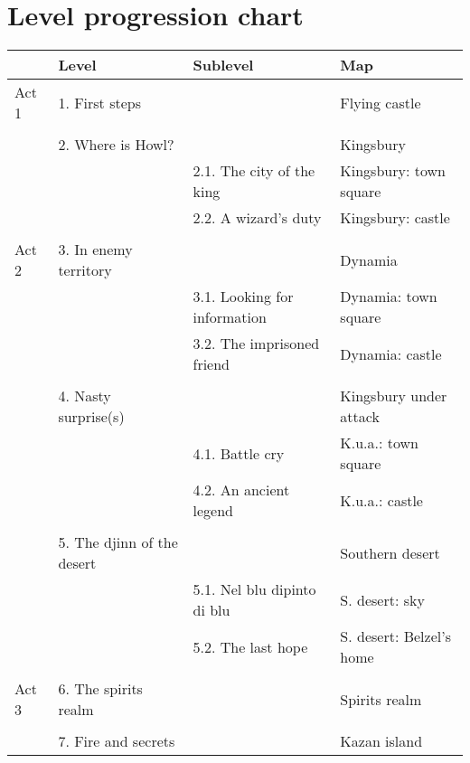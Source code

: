 \section{Level progression chart}

\begin{longtable}[H]{|p{2cm}|p{3cm}|p{3cm}|p{3cm}|}
\hline
\rowcolor[HTML]{C0C0C0} 
\multicolumn{1}{|l|}{\cellcolor[HTML]{C0C0C0}\textbf{Story act}} & \multicolumn{1}{l|}{\cellcolor[HTML]{C0C0C0}\textbf{Level}} & \multicolumn{1}{l|}{\cellcolor[HTML]{C0C0C0}\textbf{Sublevel}} & \textbf{Map} \\ \hline
\multicolumn{1}{|l|}{\cellcolor[HTML]{C0C0C0}Act 1} & \multicolumn{1}{l|}{1. First steps} & \multicolumn{1}{l|}{} & Flying castle \\ \hline
\multicolumn{1}{|l|}{} &  &  &  \\ \cline{2-4} 
 & \multicolumn{1}{l|}{2. Where is Howl?} & \multicolumn{1}{l|}{} & Kingsbury \\ \cline{2-4} 
 & \multicolumn{1}{l|}{} & \multicolumn{1}{l|}{2.1. The city of the king} & Kingsbury: town square \\ \cline{3-4} 
 & \multicolumn{1}{l|}{} & \multicolumn{1}{l|}{2.2. A wizard's duty} & Kingsbury: castle \\ \hline
\multicolumn{4}{|l|}{} \\ \hline
\multicolumn{1}{|l|}{\cellcolor[HTML]{C0C0C0}Act 2} & \multicolumn{1}{l|}{3. In enemy territory} & \multicolumn{1}{l|}{} & Dynamia \\ \hline
 & \multicolumn{1}{l|}{} & \multicolumn{1}{l|}{3.1. Looking for information} & Dynamia: town square \\ \cline{3-4} 
 & \multicolumn{1}{l|}{} & \multicolumn{1}{l|}{3.2. The imprisoned friend} & Dynamia: castle \\ \cline{2-4} 
 &  &  &  \\ \cline{2-4} 
 & \multicolumn{1}{l|}{4. Nasty surprise(s)} & \multicolumn{1}{l|}{} & Kingsbury under attack \\ \cline{2-4} 
 & \multicolumn{1}{l|}{} & \multicolumn{1}{l|}{4.1. Battle cry} & K.u.a.: town square \\ \cline{3-4} 
 & \multicolumn{1}{l|}{} & \multicolumn{1}{l|}{4.2. An ancient legend} & K.u.a.: castle \\ \cline{2-4} 
 &  &  &  \\ \cline{2-4} 
 & \multicolumn{1}{l|}{5. The djinn of the desert} & \multicolumn{1}{l|}{} & Southern desert \\ \cline{2-4} 
 & \multicolumn{1}{l|}{} & \multicolumn{1}{l|}{5.1. Nel blu dipinto di blu} & S. desert: sky \\ \cline{3-4} 
 & \multicolumn{1}{l|}{} & \multicolumn{1}{l|}{5.2. The last hope} & S. desert: Belzel's home \\ \hline
\multicolumn{4}{|l|}{} \\ \hline
\multicolumn{1}{|l|}{\cellcolor[HTML]{C0C0C0}Act 3} & \multicolumn{1}{l|}{6. The spirits realm} & \multicolumn{1}{l|}{} & Spirits realm \\ \hline
 &  &  &  \\ \cline{2-4} 
 & \multicolumn{1}{l|}{7. Fire and secrets} & \multicolumn{1}{l|}{} & Kazan island \\ \hline


\end{longtable}
